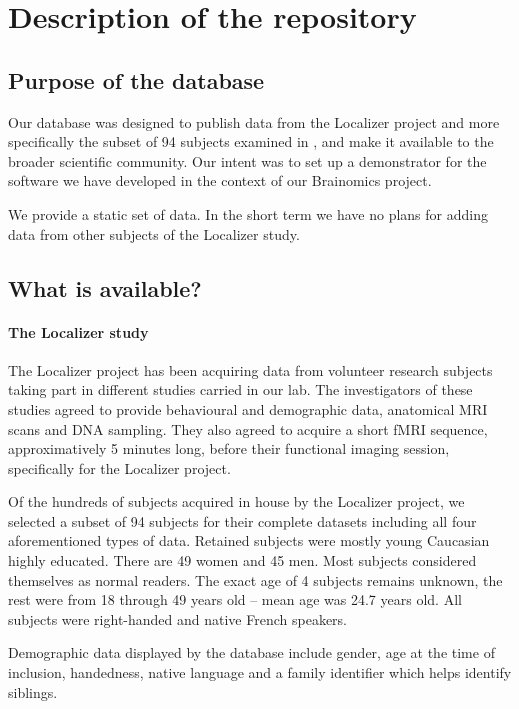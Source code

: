 \documentclass[review]{elsarticle}
\begin{document}
\section{Description of the repository}

\subsection{Purpose of the database}

Our database was designed to publish data from the Localizer project
\cite{Pinel2007} and more specifically the subset of 94 subjects examined
in \cite{Pinel2012}, and make it available to the broader
scientific community. Our intent was to set up a demonstrator for the
software we have developed in the context of our Brainomics project.

We provide a static set of data. In the short term we have no plans for
adding data from other subjects of the Localizer study.


\subsection{What is available?}

\paragraph{The Localizer study} The Localizer project has been acquiring data
from volunteer research subjects taking part in different studies carried
in our lab. The investigators of these studies agreed to provide behavioural
and demographic data, anatomical MRI scans and DNA sampling. They also agreed to
acquire a short fMRI sequence, approximatively 5 minutes long, before their functional
imaging session, specifically for the Localizer project.

Of the hundreds of subjects acquired in house by the Localizer project, we
selected a subset of 94 subjects for their complete datasets \cite{Pinel2012}
including all four aforementioned types of data. Retained subjects were mostly
young Caucasian highly educated. There are 49 women and 45 men. Most subjects
considered themselves as normal readers. The exact age of 4 subjects remains
unknown, the rest were from 18 through 49 years old -- mean age was 24.7
years old. All subjects were right-handed and native French speakers.

Demographic data displayed by the database include gender, age at the time
of inclusion, handedness, native language and a family identifier which helps
identify siblings.
\end{document}
